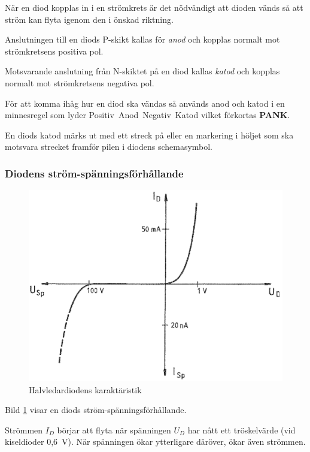 När en diod kopplas in i en strömkrets är det nödvändigt att dioden vänds så att
ström kan flyta igenom den i önskad riktning.

Anslutningen till en diods P-skikt kallas för \emph{anod} och kopplas normalt
mot strömkretsens positiva pol.

Motsvarande anslutning från N-skiktet på en diod kallas \emph{katod} och kopplas
normalt mot strömkretsens negativa pol.

För att komma ihåg hur en diod ska vändas så används anod och katod i en
minnesregel som lyder Positiv~Anod~Negativ~Katod vilket förkortas \textbf{PANK}.

En diods katod märks ut med ett streck på eller en markering i höljet som ska
motsvara strecket framför pilen i diodens schemasymbol.

\subsubsection{Diodens ström-spänningsförhållande}

\begin{figure}
\includegraphics[width=\textwidth]{images/cropped_pdfs/bild_2_2-13.pdf}
\caption{Halvledardiodens karaktäristik}
\label{fig:BildII2-13}
\end{figure}

Bild \ref{fig:BildII2-13} visar en diods ström-spänningsförhållande.

Strömmen \(I_D\) börjar att flyta när spänningen \(U_D\) har nått ett
tröskelvärde (vid kiseldioder 0,6~V).
När spänningen ökar ytterligare däröver, ökar även strömmen.

